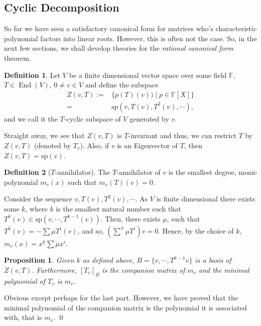\documentclass[
]{article}
\newtheorem{prop}{Proposition}[section]
\theoremstyle{definition}
\newtheorem{definition}{Definition}[section]
\begin{document}
\hypertarget{cyclic-decomposition}{%
\subsection{Cyclic Decomposition}\label{cyclic-decomposition}}

So far we have seen a satisfactory canonical form for matrices who's
characteristic polynomial factors into linear roots. However, this is
often not the case. So, in the next few sections, we shall develop
theories for the \emph{rational canonical form} theorem.

\begin{definition}
  Let \(V\) be a finite dimensional vector space over some field \(\mathbb{F}\), 
  \(T \in \mathop{\mathrm{End}}(V)\), \(0 \neq v \in V\) and define the subspace
  \begin{align*}
    Z(v, T) := & \{p(T)(v)) \mid p \in \mathbb{F}[X]\} \\
      = & \text{sp}(v, T(v), T^2(v), \cdots),
  \end{align*}
  and we call it the  \(T\)-cyclic subspace of \(V\) generated by \(v\).
\end{definition}

Straight away, we see that \(Z(v, T)\) is \(T\)-invariant and thus, we
can restrict \(T\) by \(Z(v, T)\) (denoted by \(T_v\)). Also, if \(v\)
is an Eigenvector of \(T\), then \(Z(v, T) = \text{sp}(v)\).

\begin{definition}[\(T\)-annihilator]
  The \(T\)-annihilator of \(v\) is the smallest degree, monic polynomial \(m_v(x)\) 
  such that \(m_v(T)(v) = 0\).
\end{definition}

Consider the sequence \(v, T(v), T^2(v), \cdots\). As \(V\) is finite
dimensional there exists some \(k\), where \(k\) is the smallest natural
number such that \(T^k(v) \in \text{sp}(v, \cdots, T^{k - 1}(v))\).
Then, there exists \(\mu\), such that \(T^k(v) = - \sum \mu T^i(v)\),
and so, \((\sum^n \mu T^i)v = 0\). Hence, by the choice of \(k\),
\(m_v(x) = x^k \sum \mu x^i\).

\begin{prop}\label{annihilator}
  Given \(k\) as defined above, \(B = \{v, \cdots, T^{k - 1}v\}\) is a basis 
  of \(Z(v, T)\). Furthermore, \([T_v]_B\) is the companion matrix of \(m_v\) and 
  the minimal polynomial of \(T_v\) is \(m_v\).
\end{prop}
\proof

Obvious except perhaps for the last part. However, we have proved that
the minimal polynomial of the companion matrix is the polynomial it is
associated with, that is \(m_v\). \qed
\end{document}
